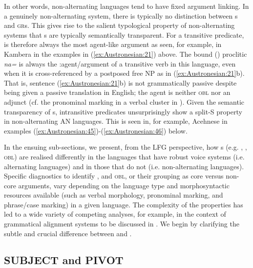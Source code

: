 \documentclass[output=paper,chinesefont]{../langscibook}
\begin{document}
In other words, non-alternating languages tend to have fixed argument linking. In a genuinely non-alternating system, there is typically no distinction between {\GF}s and \textsc{gr}s. This gives rise to the salient typological property of non-alternating systems that {\GF}s are typically semantically transparent. For a transitive predicate, \SUBJ is therefore always the most agent-like argument as seen, for example, in Kambera in the examples in (\ref{ex:Austronesian:21}) above. The bound (\NOM) proclitic \emph{na=} is always the :agent/\SUBJ argument of a transitive verb in this language, even when it is cross-referenced by a postposed free NP as in (\ref{ex:Austronesian:21}b). That is, sentence (\ref{ex:Austronesian:21}b) is not grammatically passive despite being given a passive translation in English; the agent is neither \textsc{obl} nor an adjunct (cf. the pronominal marking in a verbal cluster in \citealt{Klamer1996}). Given the semantic transparency of {\GF}s, intransitive predicates unsurprisingly show a split-S property in non-alternating AN languages. This is seen in, for example, Acehnese in examples (\ref{ex:Austronesian:45})-(\ref{ex:Austronesian:46}) below.

In the ensuing sub-sections, we present, from the LFG perspective, how {\GF}s (e.g. \SUBJ, \OBJ, \textsc{obl}) are realised differently in the languages that have robust voice systems (i.e. alternating languages) and in those that do not (i.e. non-alternating languages). Specific diagnostics to identify \SUBJ, \OBJ and \textsc{obl}, or their grouping as core versus non-core arguments, vary depending on the language type and morphosyntactic resources available (such as verbal morphology, pronominal marking, and phrase/case marking) in a given language. The complexity of the properties has led to a wide variety of competing analyses, for example, in the context of grammatical alignment systems to be discussed in . We begin by clarifying the subtle and crucial difference between \SUBJ and \PIVOT. 

\subsection{SUBJECT and PIVOT}
\label{sec:Austronesian:4.1}
\end{document}
